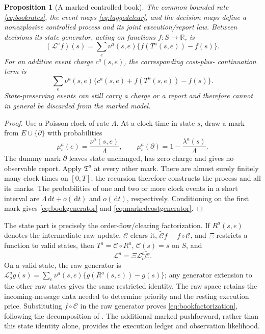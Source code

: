 \documentclass[11pt]{article}
\numberwithin{equation}{section}
\newtheorem{proposition}[theorem]{Proposition}
\theoremstyle{definition}
\theoremstyle{remark}
\newcommand{\R}{\mathbb{R}}
\theoremstyle{definition}
\newcommand{\dd}{\,\mathrm d}
\begin{document}
\begin{proposition}[A marked controlled book]\label{prop:bookgenerator}
The common bounded rate \eqref{eq:bookrates}, the event maps
\eqref{eq:taggedclear}, and the decision maps define a nonexplosive controlled
process and its joint execution/report law. Between decisions its state
generator, acting on functions $f:S\to\R$, is
\begin{equation}\label{eq:bookgenerator}
 (\mathscr L^a f)(s)=
 \sum_e\nu^a(s,e)\{f(T^a(s,e))-f(s)\}.
\end{equation}
For an additive event charge $c^a(s,e)$, the corresponding cost-plus-
continuation term is
\begin{equation}\label{eq:markedcostgenerator}
 \sum_e\nu^a(s,e)
 \{c^a(s,e)+f(T^a(s,e))-f(s)\}.
\end{equation}
State-preserving events can still carry a charge or a report and therefore
cannot in general be discarded from the marked model.
\end{proposition}
\begin{proof}
Use a Poisson clock of rate $\Lambda$. At a clock time in state $s$, draw a
mark from $E\cup\{\partial\}$ with probabilities
\begin{equation}\label{eq:bookuniformization}
 \mu_s^a(e)=\frac{\nu^a(s,e)}{\Lambda},\qquad
 \mu_s^a(\partial)=1-\frac{\lambda^a(s)}{\Lambda}.
\end{equation}
The dummy mark $\partial$ leaves state unchanged, has zero charge and gives
no observable report. Apply $\mathfrak T^a$ at every other mark. There are
almost surely finitely many clock times on $[0,T]$; the recursion therefore
constructs the process and all its marks. The probabilities of one and two
or more clock events in a short interval are $\Lambda\dd t+o(\dd t)$ and
$o(\dd t)$, respectively. Conditioning on the first mark gives
\eqref{eq:bookgenerator} and \eqref{eq:markedcostgenerator}.
\end{proof}

The state part is precisely the order-flow/clearing factorization. If
$R^a(s,e)$ denotes the intermediate raw update, $\mathcal C$ clears it,
$\widetilde{\mathcal C}f=f\circ\mathcal C$, and $\Xi$ restricts a function
to valid states, then $T^a=\mathcal C\circ R^a$, $\mathcal C(s)=s$ on
$S$, and
\begin{equation}\label{eq:bookfactorization}
 \mathscr L^a=\Xi\mathscr L_o^a\widetilde{\mathcal C}.
\end{equation}
On a valid state, the raw generator is
$\mathscr L_o^a g(s)=\sum_e\nu^a(s,e)\{g(R^a(s,e))-g(s)\}$;
any generator extension to the other raw states gives the same restricted
identity. The raw space retains the incoming-message data needed to determine
priority and the resting execution price. Substituting $f\circ\mathcal C$
in the raw generator proves \eqref{eq:bookfactorization}, following the
decomposition of \citet{contdegondxuan2025}. The additional marked
pushforward, rather than this state identity alone, provides the execution
ledger and observation likelihood.
\end{document}
